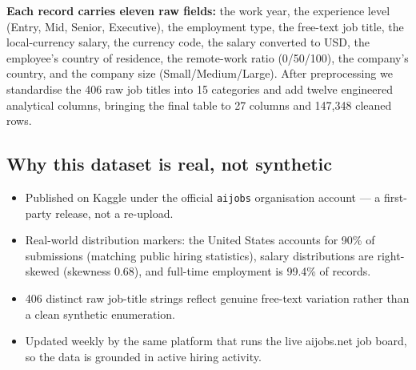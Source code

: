 \documentclass[11pt,a4paper,oneside]{report}
\begin{document}
\textbf{Each record carries eleven raw fields:} the work year, the experience level (Entry, Mid, Senior, Executive), the employment type, the free-text job title, the local-currency salary, the currency code, the salary converted to USD, the employee's country of residence, the remote-work ratio (0/50/100), the company's country, and the company size (Small/Medium/Large). After preprocessing we standardise the 406 raw job titles into 15 categories and add twelve engineered analytical columns, bringing the final table to 27 columns and 147,348 cleaned rows.

\subsection*{Why this dataset is real, not synthetic}
\begin{itemize}[leftmargin=*]
    \item Published on Kaggle under the official \texttt{aijobs} organisation account — a first-party release, not a re-upload.
    \item Real-world distribution markers: the United States accounts for 90\% of submissions (matching public hiring statistics), salary distributions are right-skewed (skewness 0.68), and full-time employment is 99.4\% of records.
    \item 406 distinct raw job-title strings reflect genuine free-text variation rather than a clean synthetic enumeration.
    \item Updated weekly by the same platform that runs the live aijobs.net job board, so the data is grounded in active hiring activity.
\end{itemize}
\end{document}
